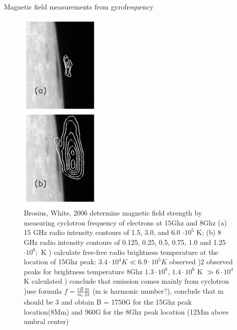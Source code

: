 \documentclass{beamer}
\begin{document}
\begin{frame}{Magnetic field measurements from gyrofrequency}

\begin{figure}[H]
 \begin{minipage}[c]{0.3\textwidth}
    \includegraphics[scale=0.6]{bw1.png}
  \end{minipage}\hfill
  \begin{minipage}[c]{0.7\textwidth}
    \caption{
			Brosius, White, 2006 determine magnetic field strength by measuring cyclotron frequency of electrons at 15Ghz and 8Ghz
			 (a) 15 GHz radio intensity contours of 1.5, 3.0, and 6.0 $\cdot 10^5$ K; 
			(b) 8 GHz radio intensity contours of 0.125, 0.25, 0.5, 0.75, 1.0 and 1.25 $\cdot 10^6;$ K
			) calculate free-free radio brightness temperature at the location of 15Ghz peak: $3.4 \cdot 10^4  K \ll 6.9 \cdot 10^5K$ observed
			)2 observed peaks for brightness temperature 8Ghz  $1.3 \cdot 10^6$, $1.4\cdot 10^6$ K  $\gg 6\cdot 10^4$K calculated
			) conclude that emission comes mainly from cyclotron
			)use formula  $f = \frac{e B}{m_e} \frac{m}{2\pi}$ (m is harmonic number?), conclude that m should be 3 and 
			obtain B = 1750G for the 15Ghz peak location(8Mm) and 960G for  the 8Ghz peak location (12Mm above umbral center)
    } 
  \end{minipage}
\end{figure}

\end{frame}
\end{document}
